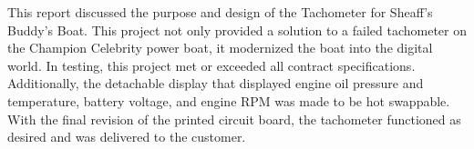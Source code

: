This report discussed the purpose and design of the Tachometer for Sheaff's Buddy's Boat. This project not only provided a solution to a failed tachometer on the Champion Celebrity power boat, it modernized the boat into the digital world. In testing, this project met or exceeded all contract specifications. Additionally, the detachable display that displayed engine oil pressure and temperature, battery voltage, and engine RPM was made to be hot swappable. With the final revision of the printed circuit board, the tachometer functioned as desired and was delivered to the customer.